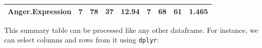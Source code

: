 \documentclass[]{article}
\newenvironment{Shaded}{\begin{snugshade}}{\end{snugshade}}
\newcommand{\KeywordTok}[1]{\textcolor[rgb]{0.13,0.29,0.53}{\textbf{#1}}}
\newcommand{\DataTypeTok}[1]{\textcolor[rgb]{0.13,0.29,0.53}{#1}}
\newcommand{\DecValTok}[1]{\textcolor[rgb]{0.00,0.00,0.81}{#1}}
\newcommand{\StringTok}[1]{\textcolor[rgb]{0.31,0.60,0.02}{#1}}
\newcommand{\CommentTok}[1]{\textcolor[rgb]{0.56,0.35,0.01}{\textit{#1}}}
\newcommand{\OtherTok}[1]{\textcolor[rgb]{0.56,0.35,0.01}{#1}}
\newcommand{\OperatorTok}[1]{\textcolor[rgb]{0.81,0.36,0.00}{\textbf{#1}}}
\newcommand{\NormalTok}[1]{#1}
\theoremstyle{definition}
\theoremstyle{definition}
\theoremstyle{definition}
\theoremstyle{remark}
\begin{document}
\begin{longtable}[]{@{}ccccccccc@{}}
\begin{minipage}[t]{0.22\columnwidth}
\textbf{Anger.Expression}\strut
\end{minipage} & \begin{minipage}[t]{0.07\columnwidth}\centering\strut
7\strut
\end{minipage} & \begin{minipage}[t]{0.05\columnwidth}\centering\strut
78\strut
\end{minipage} & \begin{minipage}[t]{0.08\columnwidth}\centering\strut
37\strut
\end{minipage} & \begin{minipage}[t]{0.08\columnwidth}\centering\strut
12.94\strut
\end{minipage} & \begin{minipage}[t]{0.06\columnwidth}\centering\strut
7\strut
\end{minipage} & \begin{minipage}[t]{0.06\columnwidth}\centering\strut
68\strut
\end{minipage} & \begin{minipage}[t]{0.08\columnwidth}\centering\strut
61\strut
\end{minipage} & \begin{minipage}[t]{0.08\columnwidth}\centering\strut
1.465\strut
\end{minipage}\tabularnewline
\bottomrule
\end{longtable}

This summary table can be processed like any other dataframe. For
instance, we can select columns and rows from it using \texttt{dplyr}:

\begin{Shaded}
\end{Shaded}
\end{document}
